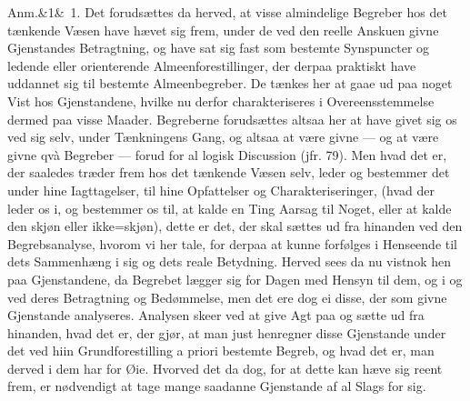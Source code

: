 \documentclass[12pt]{book}
\def\sperr#1{#1}%
\def\textit#1{#1}%
\def\emph#1{#1}%
\newcommand{\sperr}[1]{\textls[180]{#1}}
\newcommand{\anm}[1]{%
  \par\vspace{0.5\baselineskip}%
  \noindent\hspace{\parindent}\sperr{Anm.}\ifx&#1&\else~\textit{#1}.\fi
  \enspace\ignorespaces
}
\newcommand{\opage}[1]{\marginnote{\footnotesize\textit{[#1]}}}
\begin{document}
\opage{216} \anm{1} Det forudsættes da herved, at visse almindelige Begreber hos det tænkende
Væsen have hævet sig frem, under de ved den reelle Anskuen givne Gjenstandes
Betragtning, og have sat sig fast som bestemte Synspuncter og ledende eller
orienterende Almeenforestillinger, der derpaa \emph{praktiskt} have uddannet sig
til bestemte Almeenbegreber. De tænkes her at gaae ud paa noget Vist hos
Gjenstandene, hvilke nu derfor charakteriseres i Overeensstemmelse dermed paa
visse Maader. Begreberne forudsættes altsaa her at have givet sig os ved sig
selv, under Tænkningens Gang, og altsaa at være givne --- og at være givne
\textit{qvà} Begreber --- forud for al logisk Discussion (jfr. 79). Men hvad det
er, der saaledes træder frem hos det tænkende Væsen selv, leder og bestemmer det
under hine Iagttagelser, til hine Opfattelser og Charakteriseringer, (hvad der
leder os i, og bestemmer os til, at kalde en Ting Aarsag til Noget, eller at
kalde den skjøn eller ikke=skjøn), dette er det, der skal sættes ud fra hinanden
ved den Begrebsanalyse, hvorom vi her tale, for derpaa at kunne forfølges i
Henseende til dets Sammenhæng i sig og dets reale Betydning. Herved sees da nu
vistnok hen paa Gjenstandene, da Begrebet lægger sig for Dagen med Hensyn til
dem, og i og ved deres Betragtning og Bedømmelse, men det ere dog ei disse, der
som givne Gjenstande analyseres. Analysen skeer ved at give Agt paa og sætte ud
fra hinanden, hvad det er, der gjør, at man
\opage{217} just henregner disse Gjenstande under det ved hiin Grundforestilling
\textit{a priori} bestemte Begreb, og hvad det er, man derved i dem har for Øie.
Hvorved det da dog, for at dette kan hæve sig reent frem, er nødvendigt at tage
mange saadanne Gjenstande af al Slags for sig.
\end{document}
